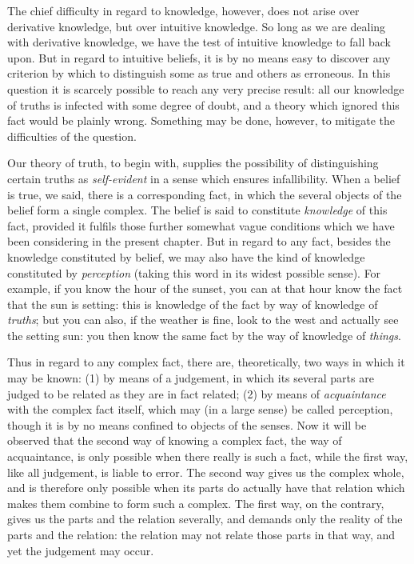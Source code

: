 \documentclass[oneside,letterpaper,12pt]{book}
\begin{document}
The chief difficulty in regard to knowledge, however, does not arise
over derivative knowledge, but over intuitive knowledge. So long as we
are dealing with derivative knowledge, we have the test of intuitive
knowledge to fall back upon. But in regard to intuitive beliefs, it is
by no means easy to discover any criterion by which to distinguish some
as true and others as erroneous. In this question it is scarcely
possible to reach any very precise result: all our knowledge of truths
is infected with some degree of doubt, and a theory which ignored this
fact would be plainly wrong. Something may be done, however, to mitigate
the difficulties of the question.

Our theory of truth, to begin with, supplies the possibility of
distinguishing certain truths as \emph{self-evident} in a sense which
ensures infallibility. When a belief is true, we said, there is a
corresponding fact, in which the several objects of the belief form a
single complex. The belief is said to constitute \emph{knowledge} of
this fact, provided it fulfils those further somewhat vague conditions
which we have been considering in the present chapter. But in regard to
any fact, besides the knowledge constituted by belief, we may also have
the kind of knowledge constituted by \emph{perception} (taking this word
in its widest possible sense). For example, if you know the hour of the
sunset, you can at that hour know the fact that the sun is setting: this
is knowledge of the fact by way of knowledge of \emph{truths}; but you
can also, if the weather is fine, look to the west and actually see the
setting sun: you then know the same fact by the way of knowledge of
\emph{things}.

Thus in regard to any complex fact, there are, theoretically, two ways
in which it may be known: (1) by means of a judgement, in which its
several parts are judged to be related as they are in fact related; (2)
by means of \emph{acquaintance} with the complex fact itself, which may
(in a large sense) be called perception, though it is by no means
confined to objects of the senses. Now it will be observed that the
second way of knowing a complex fact, the way of acquaintance, is only
possible when there really is such a fact, while the first way, like all
judgement, is liable to error. The second way gives us the complex
whole, and is therefore only possible when its parts do actually have
that relation which makes them combine to form such a complex. The first
way, on the contrary, gives us the parts and the relation severally, and
demands only the reality of the parts and the relation: the relation may
not relate those parts in that way, and yet the judgement may occur.
\end{document}

